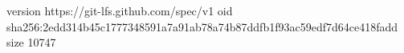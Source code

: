 version https://git-lfs.github.com/spec/v1
oid sha256:2edd314b45c1777348591a7a91ab78a74b87ddfb1f93ac59edf7d64ce418fadd
size 10747
